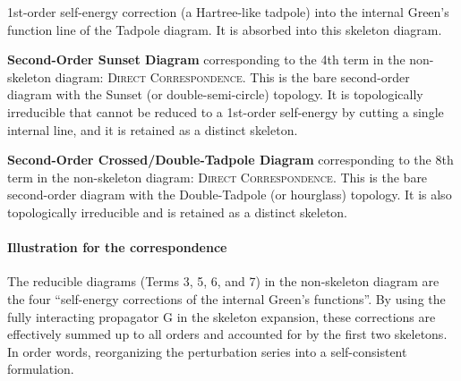 \begin{solution}
\begin{enumext}
\begin{enumext}[wrap-label = \underline{Term #1}:, label = \arabic*,
                    list-indent = 0pt]
      1st-order self-energy correction (a Hartree-like tadpole) into the
      internal Green's function line of the Tadpole diagram. It is absorbed into
      this skeleton diagram.
    \end{enumext}
    \item \textbf{Second-Order Sunset Diagram} corresponding to the 4th term in
    the non-skeleton diagram: \textsc{Direct Correspondence}. This is the bare
    second-order diagram with the Sunset (or double-semi-circle) topology. It is
    topologically irreducible that cannot be reduced to a 1st-order self-energy
    by cutting a single internal line, and it is retained as a distinct
    skeleton.
    \item \textbf{Second-Order Crossed/Double-Tadpole Diagram} corresponding to
    the 8th term in the non-skeleton diagram: \textsc{Direct Correspondence}.
    This is the bare second-order diagram with the Double-Tadpole (or hourglass)
    topology. It is also topologically irreducible and is retained as a distinct
    skeleton.
  \end{enumext}
  \paragraph{Illustration for the correspondence}
  The reducible diagrams (Terms 3, 5, 6, and 7) in the non-skeleton diagram are
  the four ``self-energy corrections of the internal Green's functions''. By
  using the fully interacting propagator G in the skeleton expansion, these
  corrections are effectively summed up to all orders and accounted for by the
  first two skeletons. In order words, reorganizing the perturbation series into
  a self-consistent formulation.
\end{solution}